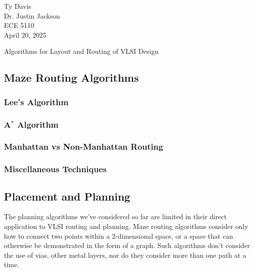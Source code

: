 \documentclass[12pt]{article}
\begin{document}
\begin{flushleft}

Ty Davis\\
Dr. Justin Jackson\\
ECE 5110\\
April 20, 2025 \\


\begin{center}
  Algorithms for Layout and Routing of VLSI Design
\end{center}



\setlength{\parindent}{0.5in}



\subsection*{Maze Routing Algorithms}

\subsubsection*{Lee's Algorithm}


\subsubsection*{A$^*$ Algorithm}


\subsubsection*{Manhattan vs Non-Manhattan Routing}


\subsubsection*{Miscellaneous Techniques}


\subsection*{Placement and Planning}

The planning algorithms we've considered so far are
limited in their direct application to VLSI routing
and planning. Maze routing algorithms consider only
how to connect two points within a 2-dimensional space,
or a space that can otherwise be demonstrated in the
form of a graph. Such algorithms don't consider the
use of vias, other metal layers, nor do they consider
more than one path at a time.


\end{flushleft}
\end{document}
